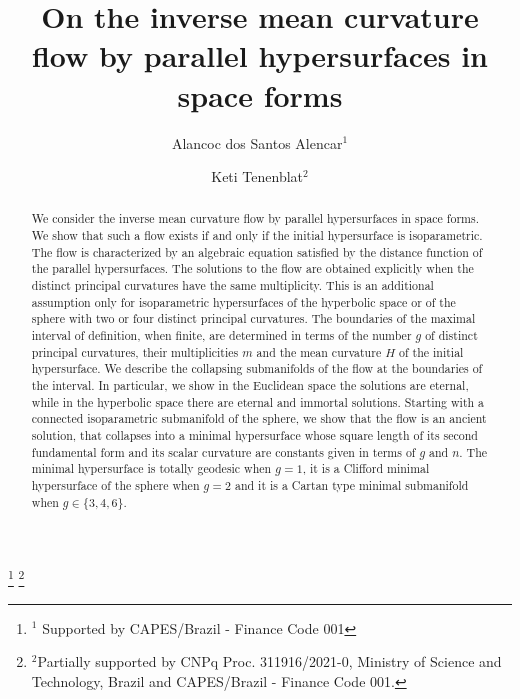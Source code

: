 \documentclass[11pt,a4paper,reqno]{amsproc}
\numberwithin{equation}{section}
\begin{document}
\title[On the inverse mean curvature flow by parallel hypersurfaces in space forms]{On the inverse mean curvature flow by parallel hypersurfaces in space forms}

\author[Alancoc dos Santos Alencar]{Alancoc dos Santos Alencar$^1$}
\author[Keti Tenenblat]{Keti Tenenblat$^2$}
\address{$^1$ Departamento de Matemática, Universidade de Brasília, Campus Universitário Darcy Ribeiro, Brasília - DF, 70910-900, Brazil}
\address{$^2$ Departamento de Matemática, Universidade de Brasília, Campus Universitário Darcy Ribeiro, Brasília - DF, 70910-900, Brazil}
\thanks{$^1$ Supported by CAPES/Brazil - Finance Code 001}
\thanks{$^2$Partially supported by CNPq Proc. 311916/2021-0, Ministry of Science and Technology, Brazil and CAPES/Brazil - Finance Code 001.}


\begin{abstract}  
We consider the inverse mean curvature flow by parallel hypersurfaces in space forms. We show that such a flow exists if and only if the initial  hypersurface is isoparametric. The flow is characterized by 
 an algebraic equation satisfied by the distance function of the parallel hypersurfaces. The solutions to the flow are obtained explicitly
 when the distinct principal curvatures  have the same multiplicity.  This is an additional assumption only for  isoparametric hypersurfaces of the hyperbolic space or of the sphere with two or four distinct principal curvatures.  The boundaries of the maximal interval of definition, 
 when finite, are determined  in terms of the number $g$ of distinct principal curvatures, their multiplicities $m$  and  the mean curvature $H$ of  the initial hypersurface. We describe the collapsing submanifolds of the flow at the boundaries of the interval.
   In particular, we show in the Euclidean space  the solutions are eternal,  while in the hyperbolic space there are eternal and immortal solutions.  
  Starting with a connected  isoparametric submanifold of the sphere, we show that the flow is an ancient solution, that collapses into a minimal hypersurface whose square length of its second fundamental form and its scalar curvature are constants given in terms of $g$ and $n$.
The minimal hypersurface is totally geodesic when $g=1$, it is a Clifford minimal hypersurface of the sphere when $g=2$ and it is a Cartan type minimal submanifold when $g\in\{3,4,6\}$.  
   \end{abstract} 
\maketitle
\end{document}
